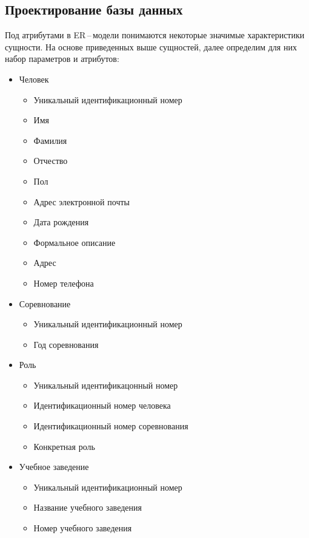 \subsection{Проектирование базы данных}
Под атрибутами в ER\,--\,модели понимаются некоторые значимые характеристики сущности.
\newpar
На основе приведенных выше сущностей, далее определим для них набор параметров и
атрибутов:
\begin{itemize}
    \item Человек
        \begin{itemize}
            \item Уникальный идентификационный номер
            \item Имя
            \item Фамилия
            \item Отчество
            \item Пол
            \item Адрес электронной почты
            \item Дата рождения
            \item Формальное описание
            \item Адрес
            \item Номер телефона
        \end{itemize}
    \item Соревнование
        \begin{itemize}
            \item Уникальный идентификационный номер
            \item Год соревнования
        \end{itemize}
    \item Роль
        \begin{itemize}
            \item Уникальный идентификацонный номер
            \item Идентификационный номер человека
            \item Идентификационный номер соревнования
            \item Конкретная роль
        \end{itemize}
    \item Учебное заведение
        \begin{itemize}
            \item Уникальный идентификационный номер
            \item Название учебного заведения
            \item Номер учебного заведения

\end{itemize}
\end{itemize}
